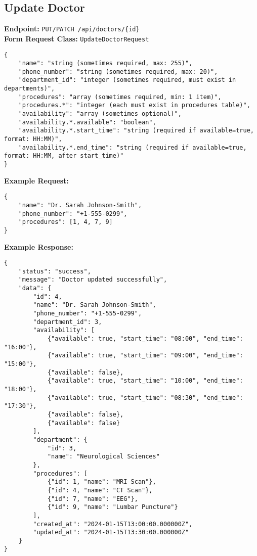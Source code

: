 \documentclass[12pt,a4paper]{article}
\begin{document}
\subsection{Update Doctor}
\textbf{Endpoint:} \texttt{PUT/PATCH /api/doctors/\{id\}}\\
\textbf{Form Request Class:} \texttt{UpdateDoctorRequest}

\begin{lstlisting}[caption=Update Doctor Request Body]
{
    "name": "string (sometimes required, max: 255)",
    "phone_number": "string (sometimes required, max: 20)",
    "department_id": "integer (sometimes required, must exist in departments)",
    "procedures": "array (sometimes required, min: 1 item)",
    "procedures.*": "integer (each must exist in procedures table)",
    "availability": "array (sometimes optional)",
    "availability.*.available": "boolean",
    "availability.*.start_time": "string (required if available=true, format: HH:MM)",
    "availability.*.end_time": "string (required if available=true, format: HH:MM, after start_time)"
}
\end{lstlisting}

\textbf{Example Request:}
\begin{lstlisting}[caption=Update Doctor Example Request]
{
    "name": "Dr. Sarah Johnson-Smith",
    "phone_number": "+1-555-0299",
    "procedures": [1, 4, 7, 9]
}
\end{lstlisting}

\textbf{Example Response:}
\begin{lstlisting}[caption=Update Doctor Example Response]
{
    "status": "success",
    "message": "Doctor updated successfully",
    "data": {
        "id": 4,
        "name": "Dr. Sarah Johnson-Smith",
        "phone_number": "+1-555-0299",
        "department_id": 3,
        "availability": [
            {"available": true, "start_time": "08:00", "end_time": "16:00"},
            {"available": true, "start_time": "09:00", "end_time": "15:00"},
            {"available": false},
            {"available": true, "start_time": "10:00", "end_time": "18:00"},
            {"available": true, "start_time": "08:30", "end_time": "17:30"},
            {"available": false},
            {"available": false}
        ],
        "department": {
            "id": 3,
            "name": "Neurological Sciences"
        },
        "procedures": [
            {"id": 1, "name": "MRI Scan"},
            {"id": 4, "name": "CT Scan"},
            {"id": 7, "name": "EEG"},
            {"id": 9, "name": "Lumbar Puncture"}
        ],
        "created_at": "2024-01-15T13:00:00.000000Z",
        "updated_at": "2024-01-15T13:30:00.000000Z"
    }
}
\end{lstlisting}
\end{document}
